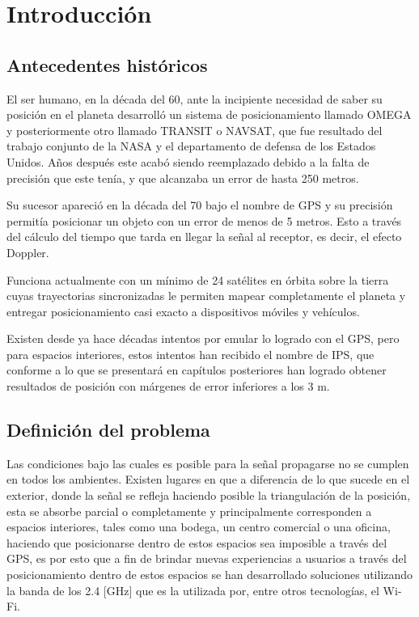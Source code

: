 
\chapter{Introducción}

\section{Antecedentes históricos}
El ser humano, en la década del 60, ante la incipiente necesidad de saber su posición en el planeta desarrolló un sistema de posicionamiento  llamado OMEGA y posteriormente otro llamado TRANSIT o \ac{NAVSAT}, que  fue resultado del trabajo conjunto de la NASA y el departamento de defensa de los Estados Unidos. Años después este acabó siendo reemplazado debido a la falta de precisión que este tenía, y que alcanzaba un error de hasta 250 metros.

Su sucesor apareció en la década del 70 bajo el nombre de \ac{GPS} y su precisión permitía posicionar un objeto con un error de menos de 5 metros. Esto a través del cálculo del tiempo que tarda en llegar la señal al receptor, es decir, el efecto Doppler.

Funciona actualmente con un mínimo de 24 satélites en órbita sobre la tierra cuyas trayectorias sincronizadas le permiten mapear completamente el planeta y entregar posicionamiento casi exacto a dispositivos móviles y vehículos.

Existen desde ya hace décadas intentos por emular lo logrado con el GPS, pero para espacios interiores, estos intentos han recibido el nombre de \ac{IPS}, que conforme a lo que se presentará en capítulos posteriores han logrado obtener resultados de posición con márgenes de error inferiores a los 3 m. 

\section{Definición del problema}
Las condiciones bajo las cuales es posible para la señal propagarse no se cumplen en todos los ambientes. Existen lugares en que a diferencia de lo que sucede en el exterior, donde la señal se refleja haciendo posible la triangulación de la posición, esta se absorbe parcial o completamente y principalmente corresponden a espacios interiores, tales como una bodega, un centro comercial o una oficina, haciendo que posicionarse dentro de estos espacios sea imposible a través del GPS, es por esto que a fin de brindar nuevas experiencias a usuarios a través del posicionamiento dentro de estos espacios se han desarrollado soluciones utilizando la banda de los 2.4 [GHz] que es la utilizada por, entre otros tecnologías, el Wi-Fi. 

